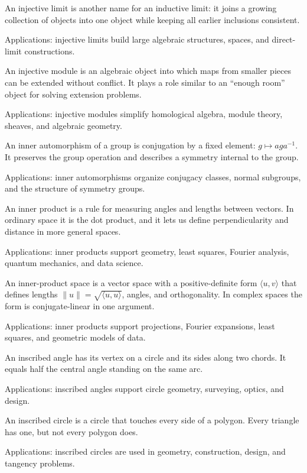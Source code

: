 An injective limit is another name for an inductive limit: it joins a growing collection of objects into one object while keeping all earlier inclusions consistent. \par\noindent Applications: injective limits build large algebraic structures, spaces, and direct-limit constructions.

An injective module is an algebraic object into which maps from smaller pieces can be extended without conflict. It plays a role similar to an “enough room” object for solving extension problems. \par\noindent Applications: injective modules simplify homological algebra, module theory, sheaves, and algebraic geometry.

An inner automorphism of a group is conjugation by a fixed element: $g\mapsto aga^{-1}$. It preserves the group operation and describes a symmetry internal to the group. \par\noindent Applications: inner automorphisms organize conjugacy classes, normal subgroups, and the structure of symmetry groups.

An inner product is a rule for measuring angles and lengths between vectors. In ordinary space it is the dot product, and it lets us define perpendicularity and distance in more general spaces. \par\noindent Applications: inner products support geometry, least squares, Fourier analysis, quantum mechanics, and data science.

An inner-product space is a vector space with a positive-definite form $\langle u,v\rangle$ that defines lengths $\|u\|=\sqrt{\langle u,u\rangle}$, angles, and orthogonality. In complex spaces the form is conjugate-linear in one argument. \par\noindent Applications: inner products support projections, Fourier expansions, least squares, and geometric models of data.

An inscribed angle has its vertex on a circle and its sides along two chords. It equals half the central angle standing on the same arc. \par\noindent Applications: inscribed angles support circle geometry, surveying, optics, and design.

An inscribed circle is a circle that touches every side of a polygon. Every triangle has one, but not every polygon does. \par\noindent Applications: inscribed circles are used in geometry, construction, design, and tangency problems.

